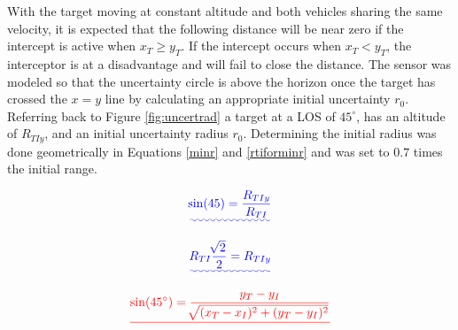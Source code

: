 \documentclass[conference]{IEEEtran}
\providecommand{\DIFadd}[1]{{\protect\color{blue}\uwave{#1}}} %
\providecommand{\DIFdel}[1]{{\protect\color{red}\sout{#1}}}                      %
\providecommand{\DIFaddbegin}{} %
\providecommand{\DIFaddend}{} %
\providecommand{\DIFdelbegin}{} %
\providecommand{\DIFdelend}{} %
\newcommand{\DIFscaledelfig}{0.5}
\newlength{\DIFdelgraphicswidth} %
\newlength{\DIFdelgraphicsheight} %
\newcommand{\DIFaddincludegraphics}[2][]{{\color{blue}\fbox{\DIFOincludegraphics[#1]{#2}}}} %
\newcommand{\DIFdelincludegraphics}[2][]{%
\sbox{\DIFdelgraphicsbox}{\DIFOincludegraphics[#1]{#2}}%
\settoboxwidth{\DIFdelgraphicswidth}{\DIFdelgraphicsbox} %
\settoboxtotalheight{\DIFdelgraphicsheight}{\DIFdelgraphicsbox} %
\scalebox{\DIFscaledelfig}{%
\parbox[b]{\DIFdelgraphicswidth}{\usebox{\DIFdelgraphicsbox}\\[-\baselineskip] \rule{\DIFdelgraphicswidth}{0em}}\llap{\resizebox{\DIFdelgraphicswidth}{\DIFdelgraphicsheight}{%
\setlength{\unitlength}{\DIFdelgraphicswidth}%
\begin{picture}(1,1)%
\thicklines\linethickness{2pt} %
{\color[rgb]{1,0,0}\put(0,0){\framebox(1,1){}}}%
{\color[rgb]{1,0,0}\put(0,0){\line( 1,1){1}}}%
{\color[rgb]{1,0,0}\put(0,1){\line(1,-1){1}}}%
\end{picture}%
}\hspace*{3pt}}} %
} %
\DeclareRobustCommand{\DIFaddbegin}{\DIFOaddbegin \let\includegraphics\DIFaddincludegraphics} %
\DeclareRobustCommand{\DIFaddend}{\DIFOaddend \let\includegraphics\DIFOincludegraphics} %
\DeclareRobustCommand{\DIFdelbegin}{\DIFOdelbegin \let\includegraphics\DIFdelincludegraphics} %
\DeclareRobustCommand{\DIFdelend}{\DIFOaddend \let\includegraphics\DIFOincludegraphics} %
\begin{document}
\DIFdelend %

With the target moving at constant altitude and both vehicles sharing the same velocity, it is expected that the following distance will be near zero if the intercept is active when $x_T \geq y_T$. If the intercept occurs when $x_T<y_T$, the interceptor is at a disadvantage and will fail to close the distance. The sensor was modeled so that the uncertainty circle is above the horizon once the target has crossed the $x=y$ line by calculating an appropriate initial uncertainty $r_0$. Referring back to Figure \ref{fig:uncertrad} a target \DIFaddbegin \DIFadd{is detected }\DIFaddend at a LOS of $45^{\circ}$, has an altitude of $R_{TIy}$, and an initial uncertainty radius $r_0$. Determining the initial radius was done geometrically in Equations \ref{minr} and \ref{rtiforminr} and was set to $0.7$ times the initial range.

\DIFaddbegin \begin{equation} \DIFadd{\label{minr}
\sin(45) = \frac{R_{TIy}}{R_{TI}}
}\end{equation}
\DIFaddend 

\DIFaddbegin \begin{equation} \DIFadd{\label{rtiforminr}
R_{TI}\frac{\sqrt[]{2}}{2} = R_{TIy}
}\end{equation}
\DIFaddend 

\DIFdelbegin \begin{displaymath} \DIFdel{%
\sin(45^\circ) = \frac{y_T - y_I}{\sqrt[]{(x_T - x_I)^2+(y_T - y_I)^2}}
}\end{displaymath}
\end{document}
